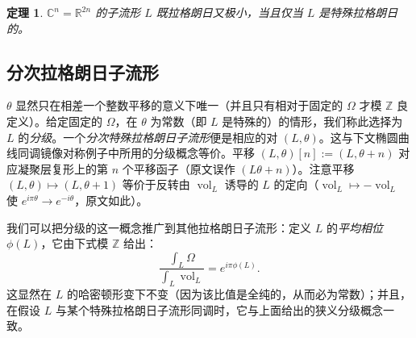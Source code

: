 \documentclass[11pt,a4paper]{article}
\theoremstyle{plain}
\newtheorem{theorem}{定理}[section]
\theoremstyle{definition}
\begin{document}
\begin{theorem}
$\mathbb{C}^n=\mathbb{R}^{2n}$ 的子流形 $L$ 既拉格朗日又极小，当且仅当 $L$ 是特殊拉格朗日的。
\end{theorem}

\subsection{分次拉格朗日子流形}

$\theta$ 显然只在相差一个整数平移的意义下唯一（并且只有相对于固定的 $\Omega$ 才模 $\mathbb{Z}$ 良定义）。给定固定的 $\Omega$，在 $\theta$ 为常数（即 $L$ 是特殊的）的情形，我们称此选择为 $L$ 的\emph{分级}。一个\emph{分次特殊拉格朗日子流形}便是相应的对 $(L,\theta)$。这与下文椭圆曲线同调镜像对称例子中所用的分级概念等价。平移 $(L,\theta)[n]:=(L,\theta+n)$ 对应凝聚层复形上的第 $n$ 个平移函子（原文误作 $(L\theta+n)$）。注意平移 $(L,\theta)\mapsto(L,\theta+1)$ 等价于反转由 $\operatorname{vol}_L$ 诱导的 $L$ 的定向（$\operatorname{vol}_L\mapsto-\operatorname{vol}_L$ 使 $e^{i\pi\theta}\to e^{-i\theta}$，原文如此）。

我们可以把分级的这一概念推广到其他拉格朗日子流形：定义 $L$ 的\emph{平均相位} $\phi(L)$，它由下式模 $\mathbb{Z}$ 给出：
\[
\frac{\int_L\Omega}{\int_L\operatorname{vol}_L}=e^{i\pi\phi(L)}.
\]
这显然在 $L$ 的哈密顿形变下不变（因为该比值是全纯的，从而必为常数）；并且，在假设 $L$ 与某个特殊拉格朗日子流形同调时，它与上面给出的狭义分级概念一致。

\end{document}
